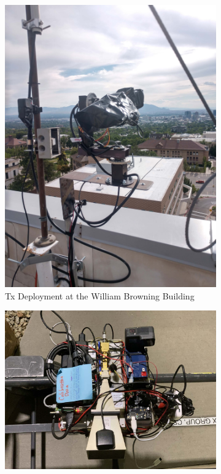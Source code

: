 \documentclass[10pt, twocolumn]{IEEEtran}
\begin{document}
\begin{figure}[t]
    \centering
    \begin{subfigure}{0.355\linewidth}
        \centering
        \includegraphics[width=0.95\linewidth]{figs/tx_deployment.pdf}
        \caption{Tx Deployment at the William Browning Building}
        \label{F3a}
    \end{subfigure}
    \begin{subfigure}{0.635\linewidth}
        \centering
        \includegraphics[width=0.95\linewidth]{figs/rx_deployment.pdf}

\end{subfigure}
\end{figure}
\end{document}
